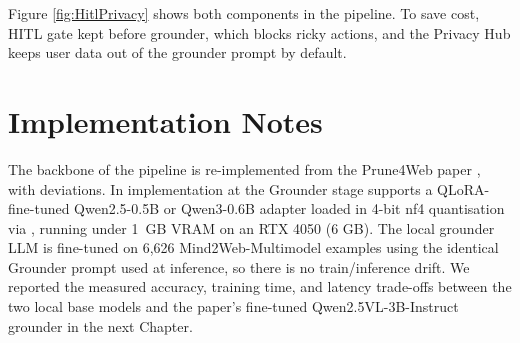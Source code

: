 Figure \ref{fig:HitlPrivacy} shows both components in the pipeline. To save cost, HITL gate kept before grounder, which blocks ricky actions, and the Privacy Hub keeps user data out of the grounder prompt by default.


\section{Implementation Notes}

The backbone of the pipeline is re-implemented from the Prune4Web paper \cite{zhang2025prune4web}, with deviations. In implementation at the Grounder stage supports a QLoRA-fine-tuned Qwen2.5-0.5B or Qwen3-0.6B adapter loaded in 4-bit nf4 quantisation via \cite{dettmers2023qlora}, running under 1~GB VRAM on an RTX 4050 (6 GB). The local grounder LLM  is fine-tuned on 6,626 Mind2Web-Multimodel examples using the identical Grounder prompt used at inference, so there is no train/inference drift. We reported the measured accuracy, training time, and latency trade-offs between the two local base models and the paper's fine-tuned Qwen2.5VL-3B-Instruct grounder \cite{zhang2025prune4web} in the next Chapter.
